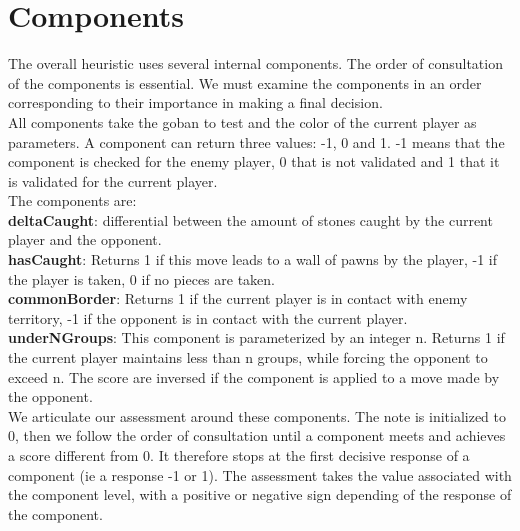 \documentclass[11pt,a4paper]{report}
\begin{document}
\section*{Components}


The overall heuristic uses several internal components. The order of consultation of the components is essential. We must examine the components in an order corresponding to their importance in making a final decision.\\


All components take the goban to test and the color of the current player as parameters. A component can return three values: -1, 0 and 1. 
-1 means that the component is checked for the enemy player, 0 that is not validated and 1 that it is validated for the current player.\\

The components are:\\

\textbf{deltaCaught}: differential between the amount of stones caught by the current player and the opponent.\\

\textbf{hasCaught}: Returns 1 if this move leads to a wall of pawns by the player, -1 if the player is taken, 0 if no pieces are taken.\\

\textbf{commonBorder}: Returns 1 if the current player is in contact with enemy territory, -1 if the opponent is in contact with the current player.\\

\textbf{underNGroups}: This component is parameterized by an integer n. Returns 1 if the current player maintains less than n groups, while forcing the opponent to exceed n. The score are inversed if the component is applied to a move made by the opponent.\\



We articulate our assessment around these components. The note is initialized to 0, then we follow the order of consultation until a component meets and achieves a score different from 0. It therefore stops at the first decisive response of a component (ie a response -1 or 1).
The assessment takes the value associated with the component level, with a positive or negative sign depending of the response of the component.\\

\bigskip
\end{document}
